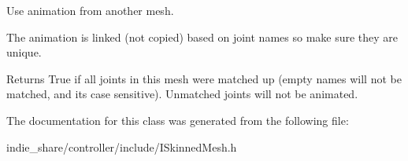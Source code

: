 Use animation from another mesh. 

The animation is linked (not copied) based on joint names so make sure they are unique. \begin{DoxyReturn}{Returns}
True if all joints in this mesh were matched up (empty names will not be matched, and it\textquotesingle{}s case sensitive). Unmatched joints will not be animated. 
\end{DoxyReturn}


The documentation for this class was generated from the following file\+:\begin{DoxyCompactItemize}
\item 
indie\+\_\+share/controller/include/I\+Skinned\+Mesh.\+h\end{DoxyCompactItemize}
